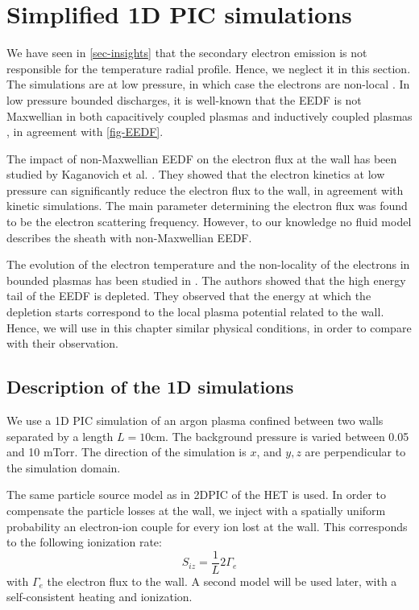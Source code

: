 
\section{Simplified 1D PIC simulations}
  \label{sec-1DPIC}

  We have seen in \cref{sec-insights} that the secondary electron emission is not responsible for the temperature radial profile.
  Hence, we neglect it in this section.
  The simulations are at low pressure, in which case  the electrons are non-local \cite{bernstein1954, godyak1993}.
  In low pressure bounded discharges, it is well-known that the EEDF is not Maxwellian in both capacitively coupled plasmas and inductively coupled plasmas \cite{mouchtouris2016, godyak2002, meige2006a, dominguez-vazquez2018}, in agreement with \cref{fig-EEDF}.

  The impact of non-Maxwellian EEDF on the electron flux at the wall has been studied by Kaganovich et al. \citep{kaganovich2000,kaganovich2007}.
  They showed that the electron kinetics at low pressure can significantly reduce the electron flux to the wall, in agreement with kinetic simulations.
  The main parameter determining the electron flux was found to be the electron scattering frequency.
  However, to our knowledge no fluid model describes the sheath with non-Maxwellian EEDF.

  The evolution of the electron temperature and the non-locality of the electrons in bounded plasmas has been studied in \citet{meige2006a}.
  The authors showed that the high energy tail of the \ac{EEDF} is depleted.
  They observed that the energy at which the depletion starts correspond to the local plasma potential related to the wall.
  Hence, we will use in this chapter similar physical conditions, in order to compare with their observation.

  \subsection{Description of the \acs{1D} simulations}

    We use a 1D PIC simulation of an argon plasma confined between two walls separated by a length $L=10$cm.
    The background pressure is varied between 0.05 and 10 mTorr.
    The direction of the simulation is $x$, and $y,z$ are perpendicular to the simulation domain.

    The same particle source model as in \ac{2D}\ac{PIC} of the \ac{HET} is used.
    In order to compensate the particle losses at the wall, we inject with a spatially uniform probability an electron-ion couple for every ion lost at the wall.
    This corresponds to the following ionization rate:
    \begin{equation}
      S_{iz} = \frac{1}{L} 2 \Gamma_e
    \end{equation}
    with $\Gamma_e$ the electron flux to the wall.
    A second model will be used later, with a self-consistent heating and ionization.


